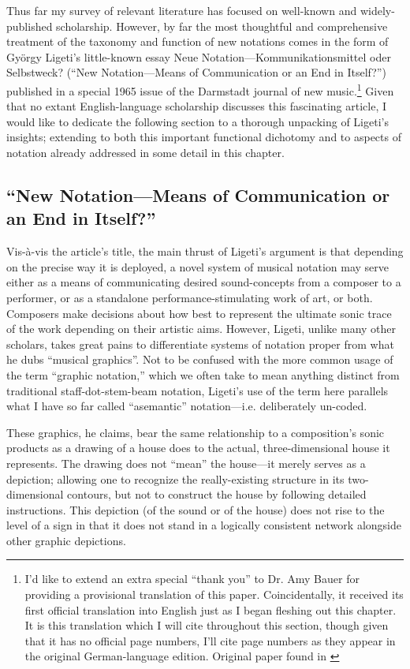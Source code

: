     Thus far my survey of relevant literature has focused on well-known and widely-published scholarship. However, by far the most thoughtful and comprehensive treatment of the taxonomy and function of new notations comes in the form of György Ligeti's little-known essay  \glqq Neue Notation---Kommunikationsmittel oder Selbstweck?\grqq {} (``New Notation---Means of Communication or an End in Itself?'') published in a special 1965 issue of the Darmstadt journal of new music.\footnote{I'd like to extend an extra special ``thank you'' to Dr. Amy Bauer for providing a provisional translation of this paper. Coincidentally, it received its first official translation into English just as I began fleshing out this chapter. It is this translation which I will cite throughout this section, though given that it has no official page numbers, I'll cite page numbers as they appear in the original German-language edition. Original paper found in \autocite{Ligeti_1965}} Given that no extant English-language scholarship discusses this fascinating article, I would like to dedicate the following section to a thorough unpacking of Ligeti's insights; extending to both this important functional dichotomy and to aspects of notation already addressed in some detail in this chapter.

    \subsection{``New Notation---Means of Communication or an End in Itself?''}

    Vis-à-vis the article's title, the main thrust of Ligeti's argument is that depending on the precise way it is deployed, a novel system of musical notation may serve either as a means of communicating desired sound-concepts from a composer to a performer, or as a standalone performance-stimulating work of art, or both. Composers make decisions about how best to represent the ultimate sonic trace of the work depending on their artistic aims. However, Ligeti, unlike many other scholars, takes great pains to differentiate systems of notation proper from what he dubs ``musical graphics''. Not to be confused with the more common usage of the term ``graphic notation,'' which we often take to mean anything distinct from traditional staff-dot-stem-beam notation, Ligeti's use of the term here parallels what I have so far called ``asemantic'' notation---i.e. deliberately un-coded.
    
    These graphics, he claims, bear the same relationship to a composition's sonic products as a drawing of a house does to the actual, three-dimensional house it represents. The drawing does not ``mean'' the house---it merely serves as a depiction; allowing one to recognize the really-existing structure in its two-dimensional contours, but not to construct the house by following detailed instructions.  This depiction (of the sound or of the house) does not rise to the level of a sign in that it does not stand in a logically consistent network alongside other graphic depictions. 

